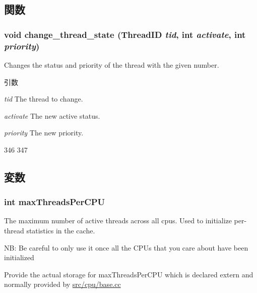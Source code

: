 \subsection{関数}
\hypertarget{smt_8hh_aaebae07f0ebacbf1a4b445bc46cf4bc7}{
\subsubsection[{change\_\-thread\_\-state}]{\setlength{\rightskip}{0pt plus 5cm}void change\_\-thread\_\-state ({\bf ThreadID} {\em tid}, \/  int {\em activate}, \/  int {\em priority})}}
\label{smt_8hh_aaebae07f0ebacbf1a4b445bc46cf4bc7}
Changes the status and priority of the thread with the given number. 
\begin{DoxyParams}{引数}
\item[{\em tid}]The thread to change. \item[{\em activate}]The new active status. \item[{\em priority}]The new priority. \end{DoxyParams}



\begin{DoxyCode}
346 {
347 }
\end{DoxyCode}


\subsection{変数}
\hypertarget{smt_8hh_a62067bc668811dd5f1bc6522bc600d56}{
\subsubsection[{maxThreadsPerCPU}]{\setlength{\rightskip}{0pt plus 5cm}int {\bf maxThreadsPerCPU}}}
\label{smt_8hh_a62067bc668811dd5f1bc6522bc600d56}
The maximum number of active threads across all cpus. Used to initialize per-\/thread statistics in the cache.

NB: Be careful to only use it once all the CPUs that you care about have been initialized

Provide the actual storage for maxThreadsPerCPU which is declared extern and normally provided by \hyperlink{cpu_2base_8cc}{src/cpu/base.cc} 